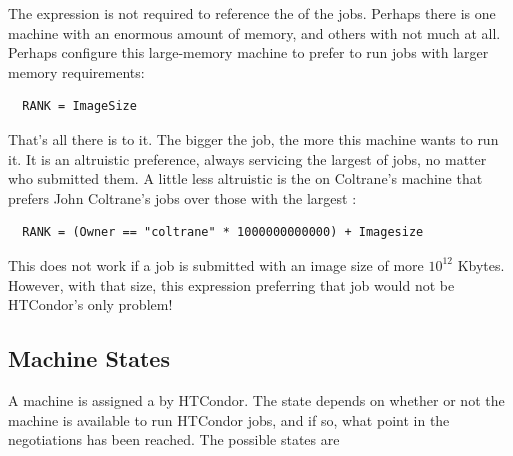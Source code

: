 The  expression is not required to reference the
 of the jobs.
Perhaps there is one machine with an enormous amount of memory,
and others with not much at all.
Perhaps configure this
large-memory machine to prefer to run jobs with larger memory
requirements:
\begin{verbatim}
  RANK = ImageSize
\end{verbatim}

That's all there is to it.
The bigger the job, the more this machine wants to run it.
It is an altruistic preference, always servicing
the largest of jobs, no matter who submitted them.
A little less altruistic is the  on Coltrane's machine that
prefers John Coltrane's jobs over those with the largest
:
\begin{verbatim}
  RANK = (Owner == "coltrane" * 1000000000000) + Imagesize
\end{verbatim}
This  does not work if a job is submitted with an image
size of more $10^{12}$ Kbytes.
However, with that size, this  expression
preferring that job would not be HTCondor's
only problem! 

\subsection{\label{sec:States} Machine States}

A machine is assigned a  by HTCondor.
The state depends on whether or not the machine is available to run HTCondor
jobs, and if so, what point in the negotiations has been reached.
The possible states are


